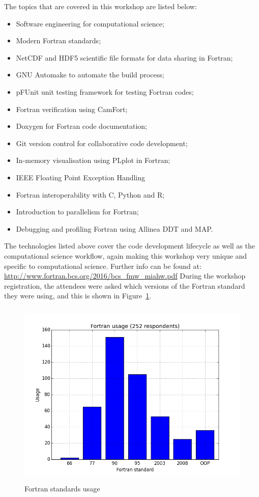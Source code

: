 \documentclass[12pt]{article}
\begin{document}
The topics that are covered in this workshop are listed below:
\begin{itemize}
\item Software engineering for computational science;
\item Modern Fortran standards;
\item NetCDF and HDF5 scientific file formats for data sharing in Fortran;
\item GNU Automake to automate the build process;
\item pFUnit unit testing framework for testing Fortran codes;
\item Fortran verification using CamFort;
\item Doxygen for Fortran code documentation;
\item Git version control for collaborative code development;
\item In-memory visualisation using PLplot in Fortran;
\item IEEE Floating Point Exception Handling
\item Fortran interoperability with C, Python and R;
\item Introduction to parallelism for Fortran;
\item Debugging and profiling Fortran using Allinea DDT and MAP.
\end{itemize}
The technologies listed above cover the code development lifecycle as well as the computational science workflow,
again making this workshop very unique and specific to computational science. Further info can be found at:
\url{http://www.fortran.bcs.org/2016/bcs_fmw_miahw.pdf}
During the workshop registration, the attendees
were asked which versions of the Fortran standard they were using, and this is shown in Figure~\ref{fortran_usage:png}. 
\begin{figure}[H]
\begin{center}
\includegraphics[width=13cm,height=9cm]{fortran_usage.png}
\caption{Fortran standards usage}\label{fortran_usage:png}
\end{center}
\end{figure}
\end{document}

